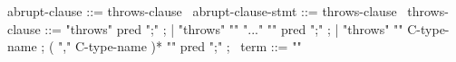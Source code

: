 \begin{syntax}
  abrupt-clause ::= throws-clause
  \
  abrupt-clause-stmt ::= throws-clause
  \
  throws-clause ::= "throws" pred ";" ;
                  | "throws" "{" "..." "}" pred ";" ;
                  | "throws" "{" C-type-name ;
                    ( "," C-type-name )* "}" pred ";" ;
  \
  term ::= "\exception"
\end{syntax}
